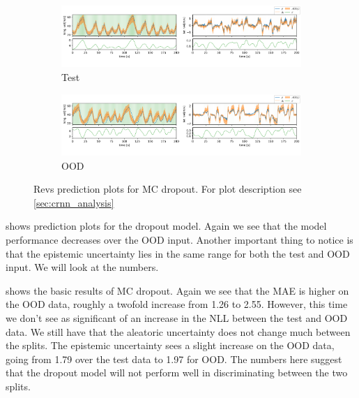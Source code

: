 \begin{figure}[htbp]
  \centering
  
  \begin{subfigure}[b]{\textwidth}
    \includegraphics[width=\textwidth]{Experiments/figs/revs_dropout_test.png}
    \caption{Test}
  \end{subfigure}
  
  \begin{subfigure}[b]{\textwidth}
    \includegraphics[width=\textwidth]{Experiments/figs/revs_dropout_ood.png}
    \caption{OOD}
  \end{subfigure}
  
  \caption[Revs prediction plots for MC dropout]{Revs prediction plots for MC dropout. For plot description see \cref{sec:crnn_analysis}}
  \label{fig:revs_dropout_run}
\end{figure}

 shows prediction plots for the dropout model. Again we see that the model performance decreases over the OOD input. Another important thing to notice is that the epistemic uncertainty lies in the same range for both the test and OOD input. We will look at the numbers.

 shows the basic results of MC dropout. Again we see that the MAE is higher on the OOD data, roughly a twofold increase from 1.26 to 2.55. However, this time we don't see as significant of an increase in the NLL between the test and OOD data. 
We still have that the aleatoric uncertainty does not change much between the splits. The epistemic uncertainty sees a slight increase on the OOD data, going from 1.79 over the test data to 1.97 for OOD. The numbers here suggest that the dropout model will not perform well in discriminating between the two splits.


